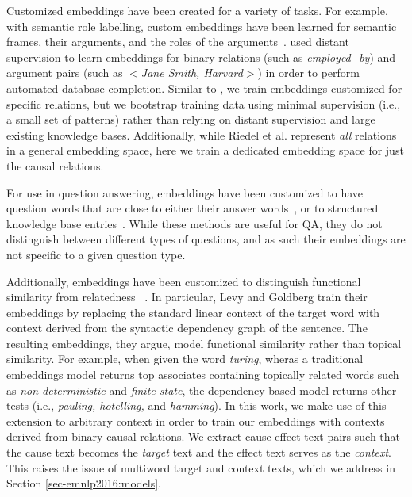 Customized embeddings have been created for a variety of tasks. %
For example, with semantic role labelling, custom embeddings have been learned for semantic frames, their arguments, and the roles of the arguments~\citep[e.g.,][]{fitzgerald2015semantic,woodsenddistributed}.  \citet{riedel2013relation} used distant supervision to learn embeddings for binary relations (such as \textit{employed\_by}) and argument pairs (such as $<$\textit{Jane Smith, Harvard}$>$) in order to perform automated database completion.  
Similar to \citeauthor{riedel2013relation}, we train embeddings customized for specific relations, but we bootstrap training data using minimal supervision (i.e., a small set of patterns) rather than relying on distant supervision and large existing knowledge bases.  Additionally, while Riedel et al. represent \textit{all} relations in a general embedding space, here we train a dedicated embedding space for just the causal relations. 

For use in question answering, embeddings have been customized to have question words that are close to either their answer words~\citep{bordes2014question}, or to structured knowledge base entries~\citep{yang2014joint}.  While these methods are useful for QA, they do not distinguish between different types of questions, and as such their embeddings are not specific to a given question type.

Additionally, embeddings have been customized to distinguish functional similarity from relatedness ~\citep{levy2014dependency,kielaspecializing}.
In particular, Levy and Goldberg train their embeddings by replacing the standard linear context of the target word with context derived from the syntactic dependency graph of the sentence.  The resulting embeddings, they argue, model functional similarity rather than topical similarity.  For example, when given the word \emph{turing}, wheras a traditional embeddings model returns top associates containing topically related words such as \emph{non-deterministic} and \emph{finite-state}, the dependency-based model returns other tests (i.e., \emph{pauling, hotelling,} and \emph{hamming}).
In this work, we make use of this extension to arbitrary context in order to train our embeddings with contexts derived from binary causal relations.  We extract cause-effect text pairs such that the cause text becomes the \emph{target} text and the effect text serves as the \emph{context}. This raises the issue of multiword target and context texts, which we address in Section \ref{sec-emnlp2016:models}.

